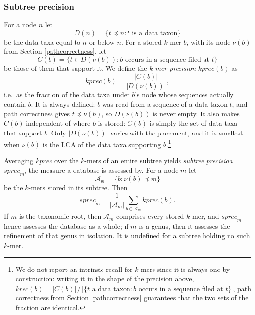 \documentclass[pdflatex,sn-vancouver-num]{sn-jnl}
\begin{document}
\subsubsection{Subtree precision}\label{subtreeprecision}
    For a node $n$ let
\[ D(n) = \{ t \preceq n : t \text{ is a data taxon} \} \]
    be the data taxa equal to $n$ or below $n$. For a stored $k$-mer $b$, with its node $\nu(b)$ from Section \ref{pathcorrectness}, let
\[ C(b) = \{ t \in D(\nu(b)) : b \text{ occurs in a sequence filed at } t \} \]
    be those of them that support it. We define the \emph{$k$-mer precision} $\mathit{kprec}(b)$ as
\[ \mathit{kprec}(b) = \frac{|C(b)|}{|D(\nu(b))|} , \]
    i.e.\ as the fraction of the data taxa under $b$'s node whose sequences actually contain $b$. It is always defined: $b$ was read from a sequence of a data taxon $t$, and path correctness gives $t \preceq \nu(b)$, so $D(\nu(b))$ is never empty. It also makes $C(b)$ independent of where $b$ is stored: $C(b)$ is simply the set of data taxa that support $b$. Only $|D(\nu(b))|$ varies with the placement, and it is smallest when $\nu(b)$ is the LCA of the data taxa supporting $b$.\footnote{We do not report an intrinsic recall for $k$-mers since it is always one by construction: writing it in the shape of the precision above, $\mathit{krec}(b) = |C(b)| \,/\, |\{ t \text{ a data taxon} : b \text{ occurs in a sequence filed at } t \}|$, path correctness from Section \ref{pathcorrectness} guarantees that the two sets of the fraction are identical.}

    Averaging $\mathit{kprec}$ over the $k$-mers of an entire subtree yields \emph{subtree precision} $\mathit{sprec}_m$, the measure a database is assessed by. For a node $m$ let
\[ \mathcal{A}_m = \{ b : \nu(b) \preceq m \} \]
    be the $k$-mers stored in its subtree. Then
\[ \mathit{sprec}_m = \frac{1}{|\mathcal{A}_m|} \sum_{b \in \mathcal{A}_m} \mathit{kprec}(b) . \]
    If $m$ is the taxonomic root, then $\mathcal{A}_m$ comprises every stored $k$-mer, and $\mathit{sprec}_m$ hence assesses the database as a whole; if $m$ is a genus, then it assesses the refinement of that genus in isolation. It is undefined for a subtree holding no such $k$-mer.
\end{document}
